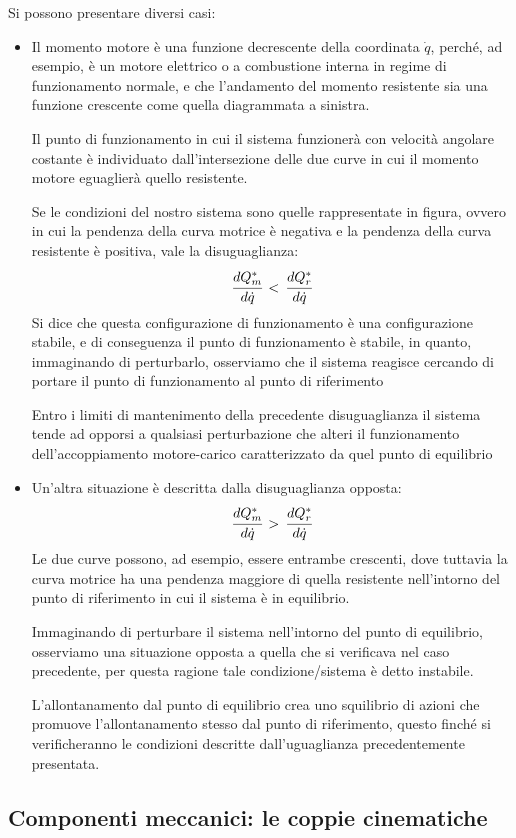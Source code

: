 Si possono presentare diversi casi:
\begin{itemize}
\item Il momento motore è una funzione decrescente della coordinata $\dot{q}$, perché, ad esempio, è un motore elettrico o a combustione interna in regime di funzionamento normale, e che l'andamento del momento resistente sia una funzione crescente come quella diagrammata a sinistra.

Il punto di funzionamento in cui il sistema funzionerà con velocità angolare costante è individuato dall'intersezione delle due curve in cui il momento motore eguaglierà quello resistente.

Se le condizioni del nostro sistema sono quelle rappresentate in figura, ovvero in cui la pendenza della curva motrice è negativa e la pendenza della curva resistente è positiva, vale la disuguaglianza:
\[\cfrac{dQ_m^*}{d\dot{q}}\,<\,\cfrac{dQ_r^*}{d\dot{q}}\]
Si dice che questa configurazione di funzionamento è una configurazione stabile, e di conseguenza il punto di funzionamento è stabile, in quanto, immaginando di perturbarlo, osserviamo che il sistema reagisce cercando di portare il punto di funzionamento al punto di riferimento

Entro i limiti di mantenimento della precedente disuguaglianza il sistema tende ad opporsi a qualsiasi perturbazione che alteri il funzionamento dell'accoppiamento motore-carico caratterizzato da quel punto di equilibrio
\item Un'altra situazione è descritta dalla disuguaglianza opposta:
\[\cfrac{dQ^*_m}{d\dot{q}}\,>\,\cfrac{dQ_r^*}{d\dot{q}}\]
Le due curve possono, ad esempio, essere entrambe crescenti, dove tuttavia la curva motrice ha una pendenza maggiore di quella resistente nell'intorno del punto di riferimento in cui il sistema è in equilibrio.

Immaginando di perturbare il sistema nell'intorno del punto di equilibrio, osserviamo una situazione opposta a quella che si verificava nel caso precedente, per questa ragione tale condizione/sistema è detto instabile.

L'allontanamento dal punto di equilibrio crea uno squilibrio di azioni che promuove l'allontanamento stesso dal punto di riferimento, questo finché si verificheranno le condizioni descritte dall'uguaglianza precedentemente presentata.
\end{itemize}

\subsection{Componenti meccanici: le coppie cinematiche}

